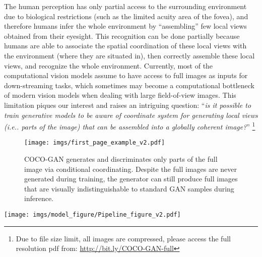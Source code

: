 \documentclass{article}
\makeatletter
\newcommand{\modelName}{COCO-GAN }
\newcommand\blfootnote[1]{\begingroup
  \renewcommand\thefootnote{}\footnote{#1}\addtocounter{footnote}{-1}\endgroup
}
\DeclareRobustCommand\onedot{\futurelet\@let@token\@onedot}
\def\@onedot{\ifx\@let@token.\else.\null\fi\xspace}
\def\ie{\emph{i.e}\onedot} \def\Ie{\emph{I.e}\onedot}
\makeatother
\begin{document}
The human perception has only partial access to the surrounding environment due to biological restrictions (such as the limited acuity area of the fovea), and therefore humans infer the whole environment by ``assembling'' few local views obtained from their eyesight. This recognition can be done partially because humans are able to associate the spatial coordination of these local views with the environment (where they are situated in), then correctly assemble these local views, and recognize the whole environment. Currently, most of the computational vision models assume to have access to full images as inputs for down-streaming tasks, which sometimes may become a computational bottleneck of modern vision models when dealing with large field-of-view images. This limitation piques our interest and raises an intriguing question: ``\textit{is it possible to train generative models to be aware of coordinate system for generating local views (\ie parts of the image) that can be assembled into a globally coherent image?}'' 
    \blfootnote{Due to file size limit, all images are compressed, please access the full resolution pdf from: {\color{blue}\urlstyle{same}\url{http://bit.ly/COCO-GAN-full}}}
    


    \begin{figure}[t]
        \centering
        \texttt{[image: imgs/first\_page\_example\_v2.pdf]}
        \caption{\modelName generates and discriminates only parts of the full image via conditional coordinating. Despite the full images are never generated during training, the generator can still produce full images that are visually indistinguishable to standard GAN samples during inference.}
        \label{fig:first-page-example-v2}
        \vspace{-1em}
    \end{figure} 
    
    \begin{figure*}[t]
        \centering
        \texttt{[image: imgs/model\_figure/Pipeline\_figure\_v2.pdf]}
        \vspace{-1.5em}
        \caption{An overview of \modelName training. The latent vectors are duplicated multiple times, concatenated with micro coordinates, and feed to the generator to generate micro patches. Then we concatenate multiple micro patches to form a larger macro patch. The discriminator learns to discriminate between real and fake macro patches and an auxiliary task predicting the coordinate of the macro patch. Note that the full images are only generated in the testing phase (Appendix~\ref{fig:model-testing-phase}).}
        \label{fig:model-architecture}
        \vspace{-1em}
    \end{figure*}
    
\end{document}
